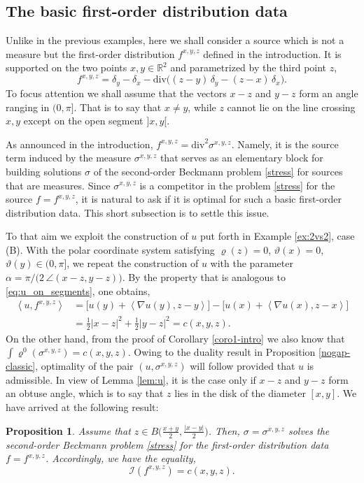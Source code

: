 \documentclass[11pt,letterpaper,reqno]{amsart}
\newtheorem{proposition}[theorem]{Proposition}
\theoremstyle{definition}
\numberwithin{equation}{section}
\newcommand{\R}{\mathbb{R}}
\newcommand{\dive}{{\mathrm{div}}}
\newcommand{\pairing}[1]{{\left \langle #1 \right \rangle}}
\newcommand{\abs}[1]{{\left \lvert #1 \right \rvert}}
\begin{document}
{\subsection{The basic first-order distribution data}

Unlike in the previous examples, here we shall consider a source which is not a measure but the 
 first-order distribution $f^{x,y,z}$ defined in the introduction. It is  supported on the two points $x,y \in \R^2$ and parametrized by the third point $z$,
\begin{equation*}
	f^{x,y,z}= \delta_y - \delta_x - \dive\big((z-y)\,\delta_y - (z-x)\,\delta_x \big).
\end{equation*}
To focus attention we shall assume that the vectors $x -z$ and $y-z$ form an angle ranging in $(0,\pi]$. That is to say that $x\neq y$, while $z$ cannot lie on the line crossing $x,y$ except on the open segment $]x,y[$.

As announced in the introduction, $f^{x,y,z}=\dive^2 \sigma^{x,y,z}$. Namely, it is the source term induced by the measure $\sigma^{x,y,z}$ that serves as an elementary block for building solutions $\sigma$ of the second-order Beckmann problem \eqref{stress} for sources that are measures. 
Since $\sigma^{x,y,z}$ is a competitor in the problem \eqref{stress} for the source $f = f^{x,y,z}$, it is natural to ask if it is optimal for such a basic  first-order distribution data. This short subsection is to settle this issue.

To that aim we exploit the construction of $u$ put forth in Example \ref{ex:2vs2}, case (B). With the polar coordinate system satisfying $\varrho(z) = 0$, $\vartheta(x) = 0$, $\vartheta(y) \in (0,\pi]$, we repeat the construction of $u$ with the parameter $\alpha = \pi/\big(2 \,\angle(x-z,y-z)\big)$. By the property that is analogous to 	\eqref{eq:u_on_segments}, one obtains,
\begin{align*}
	\pairing{u,f^{x,y,z}} &= 	\big[u(y) + \pairing{\nabla u(y),z - y} \big]  - 	\big[u(x) + \pairing{\nabla u(x),z - x} \big]  \\
	&= \tfrac{1}{2} \abs{x-z}^2 + \tfrac{1}{2} \abs{y-z}^2 = c(x,y,z).
\end{align*}
On the other hand, from the proof of Corollary \ref{coro1-intro} we also know that $\int \varrho^0(\sigma^{x,y,z}) = c(x,y,z)$.  Owing to the duality result in Proposition \ref{nogap-classic}, optimality of the pair $(u,\sigma^{x,y,z})$ will follow provided that $u$ is admissible. In view of Lemma \ref{lem:u}, it is the case only if $x-z$ and $y-z$ form an obtuse angle, which is to say that $z$ lies in the disk of the diameter $[x,y]$. We have arrived at the following result:
\begin{proposition}\label{optibasic}
	Assume that $z \in B\big(\frac{x+y}{2}, \frac{|x-y|}{2}\big)$. Then, $\sigma=\sigma^{x,y,z}$ solves the second-order Beckmann problem \eqref{stress} for the first-order distribution data $f = f^{x,y,z}$. Accordingly, we have the equality,
 $$	\mathcal{I}(f^{x,y,z}) = c(x,y,z) .$$
\end{proposition}

}
\end{document}
